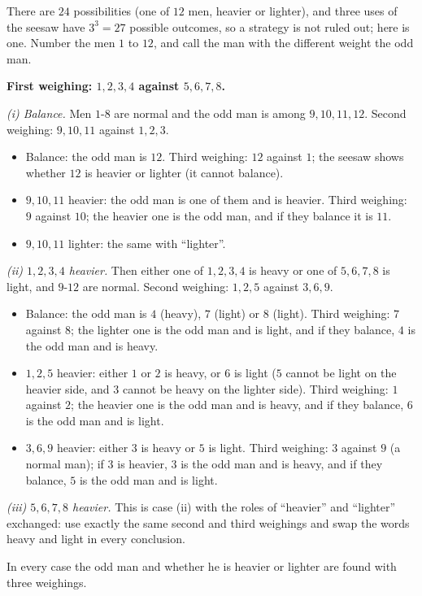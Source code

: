 There are $24$ possibilities (one of $12$ men, heavier or lighter), and three uses of the seesaw have $3^3=27$ possible outcomes, so a strategy is not ruled out; here is one. Number the men $1$ to $12$, and call the man with the different weight the odd man.

\textbf{First weighing: $1,2,3,4$ against $5,6,7,8$.}

\emph{(i) Balance.} Men $1$-$8$ are normal and the odd man is among $9,10,11,12$. Second weighing: $9,10,11$ against $1,2,3$.
\begin{itemize}
\item Balance: the odd man is $12$. Third weighing: $12$ against $1$; the seesaw shows whether $12$ is heavier or lighter (it cannot balance).
\item $9,10,11$ heavier: the odd man is one of them and is heavier. Third weighing: $9$ against $10$; the heavier one is the odd man, and if they balance it is $11$.
\item $9,10,11$ lighter: the same with ``lighter''.
\end{itemize}

\emph{(ii) $1,2,3,4$ heavier.} Then either one of $1,2,3,4$ is heavy or one of $5,6,7,8$ is light, and $9$-$12$ are normal. Second weighing: $1,2,5$ against $3,6,9$.
\begin{itemize}
\item Balance: the odd man is $4$ (heavy), $7$ (light) or $8$ (light). Third weighing: $7$ against $8$; the lighter one is the odd man and is light, and if they balance, $4$ is the odd man and is heavy.
\item $1,2,5$ heavier: either $1$ or $2$ is heavy, or $6$ is light ($5$ cannot be light on the heavier side, and $3$ cannot be heavy on the lighter side). Third weighing: $1$ against $2$; the heavier one is the odd man and is heavy, and if they balance, $6$ is the odd man and is light.
\item $3,6,9$ heavier: either $3$ is heavy or $5$ is light. Third weighing: $3$ against $9$ (a normal man); if $3$ is heavier, $3$ is the odd man and is heavy, and if they balance, $5$ is the odd man and is light.
\end{itemize}

\emph{(iii) $5,6,7,8$ heavier.} This is case (ii) with the roles of ``heavier'' and ``lighter'' exchanged: use exactly the same second and third weighings and swap the words heavy and light in every conclusion.

In every case the odd man and whether he is heavier or lighter are found with three weighings.
